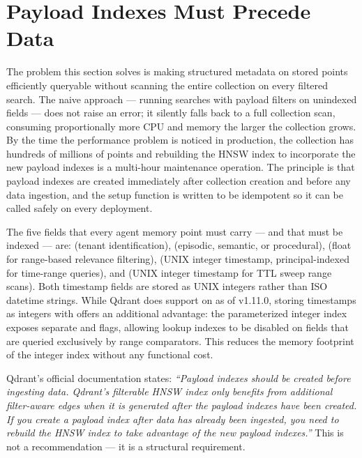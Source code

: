 \section{Payload Indexes Must Precede Data}
\label{sec:payload-indexes}

The problem this section solves is making structured metadata on stored
points efficiently queryable without scanning the entire collection on every
filtered search. The naive approach --- running searches with payload filters
on unindexed fields --- does not raise an error; it silently falls back to a
full collection scan, consuming proportionally more CPU and memory the larger
the collection grows. By the time the performance problem is noticed in
production, the collection has hundreds of millions of points and rebuilding
the HNSW index to incorporate the new payload indexes is a multi-hour
maintenance operation. The principle is that payload indexes are created
immediately after collection creation and before any data ingestion, and the
setup function is written to be idempotent so it can be called safely on
every deployment.

The five fields that every agent memory point must carry --- and that must be
indexed --- are:  (tenant identification), 
(episodic, semantic, or procedural),  (float for
range-based relevance filtering),  (UNIX integer timestamp,
principal-indexed for time-range queries), and  (UNIX
integer timestamp for TTL sweep range scans). Both timestamp fields are stored
as UNIX integers rather than ISO datetime strings. While Qdrant does support
 on  as of v1.11.0, storing
timestamps as integers with  offers an additional
advantage: the parameterized integer index exposes separate  and
 flags, allowing lookup indexes to be disabled on fields that are
queried exclusively by range comparators. This reduces the memory footprint of
the integer index without any functional cost.

\begin{notebox}
Qdrant's official documentation states: \emph{``Payload indexes should be
created before ingesting data. Qdrant's filterable HNSW index only benefits
from additional filter-aware edges when it is generated after the payload
indexes have been created. If you create a payload index after data has
already been ingested, you need to rebuild the HNSW index to take advantage
of the new payload indexes.''} This is not a recommendation --- it is a
structural requirement.
\end{notebox}

